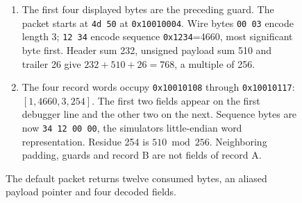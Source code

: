 \begin{figure}[htbp]
\begin{minipage}{\linewidth}
\begin{enumerate}
      \item The first four displayed bytes are the preceding guard. The packet starts at \texttt{4d 50} at \texttt{0x10010004}. Wire bytes \texttt{00 03} encode length 3; \texttt{12 34} encode sequence \texttt{0x1234}=4660, most significant byte first. Header sum 232, unsigned payload sum 510 and trailer 26 give $232+510+26=768$, a multiple of 256.
      \item The four record words occupy \texttt{0x10010108} through \texttt{0x10010117}: $[1,4660,3,254]$. The first two fields appear on the first debugger line and the other two on the next. Sequence bytes are now \texttt{34 12 00 00}, the simulator\textquotesingle s little-endian word representation. Residue 254 is $510\bmod256$. Neighboring padding, guards and record B are not fields of record A.
    \end{enumerate}
  \end{minipage}
  \caption{The default packet returns twelve consumed bytes, an aliased payload pointer and four decoded fields.}
  \label{capture:013-binary-packet-parser-f01-default}
  \label{packet-f01-default}
\end{figure}
\par
